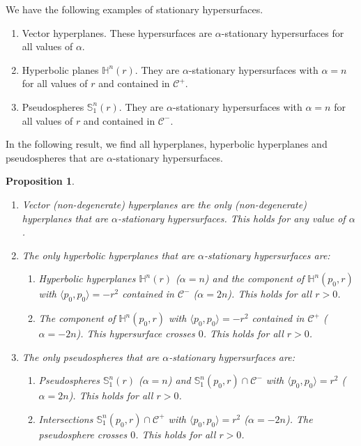 \documentclass[a4paper,12pt]{amsart}
\newtheorem{proposition}[theorem]{Proposition}
\theoremstyle{definition}
\def\h{\mathbb H}
\def\s{\mathbb S}
\begin{document}
We have the following examples of stationary hypersurfaces. 

  
\begin{enumerate}  
\item Vector  hyperplanes. These hypersurfaces are   $\alpha$-stationary hypersurfaces for all values of $\alpha$.
\item    Hyperbolic planes $\h^n(r)$. They are $\alpha$-stationary hypersurfaces with $\alpha=n$ for all values of $r$ and contained in $\mathcal{C}^+$.
\item  Pseudospheres $\s^n_1(r)$. They are $\alpha$-stationary hypersurfaces with $\alpha=n$ for all values of $r$ and contained in $\mathcal{C}^-$.
\end{enumerate}
 
In the following result, we find all hyperplanes, hyperbolic hyperplanes and pseudospheres that are $\alpha$-stationary hypersurfaces.

\begin{proposition}\label{pr1}
\begin{enumerate}
\item Vector (non-degenerate) hyperplanes are the only (non-degenerate) hyperplanes that are $\alpha$-stationary hypersurfaces. This holds for any value of $\alpha$.
\item The only hyperbolic hyperplanes that are $\alpha$-stationary hypersurfaces are:
 \begin{enumerate}
\item  Hyperbolic hyperplanes $\h^n(r)$   ($\alpha=n$) and the component of  $\h^n(p_0,r)$ with $\langle p_0,p_0\rangle=-r^2$ contained in $\mathcal{C}^-$ ($\alpha=2n$). This holds for all $r>0$.
\item The component of  $\h^n(p_0,r)$ with $\langle p_0,p_0\rangle=-r^2$ contained in $\mathcal{C}^+$ ($\alpha=-2n$). This hypersurface crosses $0$.  This holds for all $r>0$.
\end{enumerate}
\item The only pseudospheres that are $\alpha$-stationary hypersurfaces are:
\begin{enumerate}
\item  Pseudospheres $\s_1^n(r)$   ($\alpha=n$) and      $\s_1^n(p_0,r)\cap\mathcal{C}^-$ with $\langle p_0,p_0\rangle=r^2$  ($\alpha=2n$).  This holds for all $r>0$.
\item Intersections $\s_1^n(p_0,r)\cap\mathcal{C}^+$   with $\langle p_0,p_0\rangle=r^2$  ($\alpha=-2n$). The pseudosphere  crosses $0$.  This holds for all $r>0$.
\end{enumerate} 
 \end{enumerate}
\end{proposition}
\end{document}
